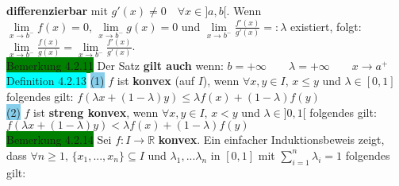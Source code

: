 \documentclass[landscape, 10pt]{article}
\newcommand{\R}{\mathbb{R}}
\begin{document}
\begin{multicols}{3}
                     \textbf{differenzierbar} mit 
                     \textcolor{NavyBlue}{$g'(x)\neq0\quad\forall x\in]a,b[$}. 
                     Wenn \textcolor{NavyBlue}{
                     $\lim\limits_{x\to b^{-}}f(x)=0,\,\lim\limits_{x\to b^{-}}g(x)=0$}
                     und \textcolor{NavyBlue}{
                     $\lim\limits_{x\to b^{-}}\frac{f'(x)}{g'(x)}=:\lambda$}
                     existiert, folgt: \textcolor{NavyBlue}{
                     $\lim\limits_{x\to b^{-}}\frac{f(x)}{g(x)}
                     =\lim\limits_{x\to b^{-}}\frac{f'(x)}{g'(x)}$}.\\
              \colorbox{green}{Bemerkung 4.2.11} 
                     Der Satz \textbf{gilt auch} wenn: 
                     \textcolor{NavyBlue}{
                     $b=+\infty\qquad\lambda=+\infty\qquad x\to a^{+}$}\\
              \colorbox{cyan}{Definition 4.2.13} 
                     \colorbox{SkyBlue}{(1)} 
                            \textcolor{NavyBlue}{$f$}
                            ist \textbf{konvex} (auf \textcolor{NavyBlue}{$I$}), wenn 
                            \textcolor{NavyBlue}{$\forall x,y\in I,\,x\leqslant y$ 
                            und $\lambda\in[0,1]$}
                            folgendes gilt: \textcolor{NavyBlue}{
                            $f(\lambda x+(1-\lambda)y)
                            \leqslant\lambda f(x)+(1-\lambda)f(y)$}\\
                     \colorbox{SkyBlue}{(2)} 
                            \textcolor{NavyBlue}{$f$} ist 
                            \textbf{streng konvex}, 
                            wenn \textcolor{NavyBlue}{$\forall x,y\in I,\,x<y$}
                            und \textcolor{NavyBlue}{$\lambda\in]0,1[$} 
                            folgendes gilt: 
                            \textcolor{NavyBlue}{
                            $f(\lambda x+(1-\lambda)y)
                            <\lambda f(x)+(1-\lambda)f(y)$}\\ 
              \colorbox{green}{Bemerkung 4.2.14} 
                     Sei \textcolor{NavyBlue}{$f:I\longrightarrow\R$} 
                     \textbf{konvex}. Ein einfacher Induktionsbeweis zeigt, dass 
                     \textcolor{NavyBlue}{
                     $\forall n\geqslant1,\,\{x_1,...,x_n\}\subseteq I$} 
                     und \textcolor{NavyBlue}{$\lambda_1,...\lambda_n$} in 
                     \textcolor{NavyBlue}{$[0,1]$} mit 
                     \textcolor{NavyBlue}{$\sum_{i=1}^n\lambda_i=1$}
                     folgendes gilt: \textcolor{NavyBlue}{
}
\end{multicols}
\end{document}
